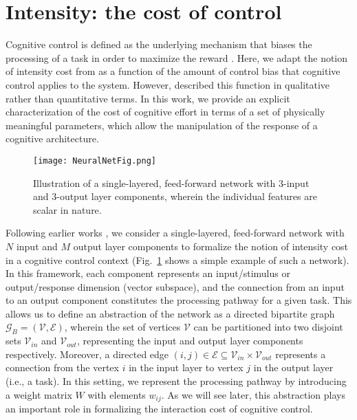 \documentclass[10pt,letterpaper]{article}
\begin{document}
\section{Intensity: the cost of control}
%
Cognitive control is defined as the underlying mechanism that biases the processing of a task in order to maximize the reward \cite{Botvinick_etal_2001, Botvinick_etal_2004, Bogacz_OptDecMak, Botvinick2007}. Here, we adapt the notion of intensity cost from  as a function of the amount of control bias that cognitive control applies to the system. However,  described this function in qualitative rather than quantitative terms. In this work, we provide an explicit characterization of the cost of cognitive effort in terms of a set of physically meaningful parameters, which allow the manipulation of the response of a cognitive architecture.
%
\begin{figure}[tb]
\begin{center}
  \texttt{[image: NeuralNetFig.png]}
  \caption{\small{Illustration of a single-layered, feed-forward network with 3-input and 3-output layer components, wherein the individual features are scalar in nature.}}
  \label{SLFF_Net_3}
\end{center}
\vspace{-2.0em}
\end{figure}

Following earlier works \cite{Feng_et_al_2014, CogSci_2016}, we consider a single-layered, feed-forward network with $N$ input and $M$ output layer components to formalize the notion of intensity cost in a cognitive control context (Fig.~\ref{SLFF_Net_3} shows a simple example of such a network). In this framework, each component represents an input/stimulus or output/response dimension (vector subspace), and the connection from an input to an output component constitutes the processing pathway for a given task. This allows us to define an abstraction of the network as a directed bipartite graph $\mathcal{G}_B = (\mathcal{V},\mathcal{E})$, wherein the set of vertices $\mathcal{V}$ can be partitioned into two disjoint sets $\mathcal{V}_{in}$ and $\mathcal{V}_{out}$, representing the input and output layer components respectively. Moreover, a directed edge $(i,j) \in \mathcal{E} \subseteq \mathcal{V}_{in} \times \mathcal{V}_{out}$ represents a connection from the vertex $i$ in the input layer to vertex $j$ in the output layer (i.e., a task). In this setting, we represent the processing pathway by introducing a weight matrix $W$ with elements $w_{ij}$. As we will see later, this abstraction plays an important role in formalizing the interaction cost of cognitive control.
\end{document}
